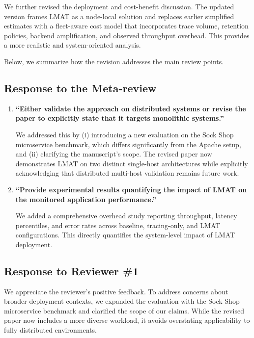 \documentclass[11pt]{article}
\begin{document}
We further revised the deployment and cost-benefit discussion. The updated version frames LMAT as a node-local solution and replaces earlier simplified estimates with a fleet-aware cost model that incorporates trace volume, retention policies, backend amplification, and observed throughput overhead. This provides a more realistic and system-oriented analysis.

Below, we summarize how the revision addresses the main review points.

\subsection*{Response to the Meta-review}

\begin{enumerate}[leftmargin=1.5em, itemsep=0.6em]
\item \textbf{``Either validate the approach on distributed systems or revise the paper to explicitly state that it targets monolithic systems.''}

We addressed this by (i) introducing a new evaluation on the Sock Shop microservice benchmark, which differs significantly from the Apache setup, and (ii) clarifying the manuscript's scope. The revised paper now demonstrates LMAT on two distinct single-host architectures while explicitly acknowledging that distributed multi-host validation remains future work.

\item \textbf{``Provide experimental results quantifying the impact of LMAT on the monitored application performance.''}

We added a comprehensive overhead study reporting throughput, latency percentiles, and error rates across baseline, tracing-only, and LMAT configurations. This directly quantifies the system-level impact of LMAT deployment.
\end{enumerate}

\subsection*{Response to Reviewer \#1}

We appreciate the reviewer's positive feedback. To address concerns about broader deployment contexts, we expanded the evaluation with the Sock Shop microservice benchmark and clarified the scope of our claims. While the revised paper now includes a more diverse workload, it avoids overstating applicability to fully distributed environments.
\end{document}

